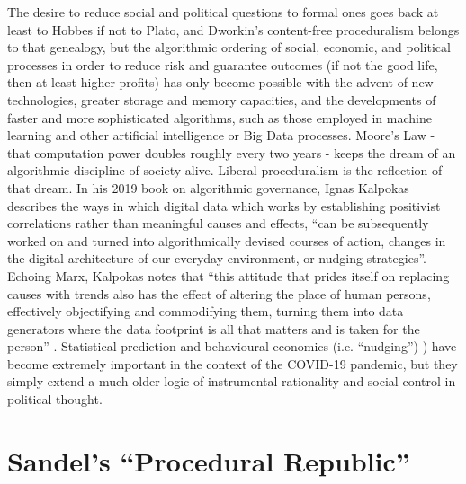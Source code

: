 \documentclass[12pt,oneside]{memoir}
\begin{document}
The desire to reduce social and political questions to formal ones goes back at least to Hobbes if not to Plato, and Dworkin's content-free proceduralism belongs to that genealogy, but the algorithmic ordering of social, economic, and political processes in order to reduce risk and guarantee outcomes (if not the good life, then at least higher profits) has only become possible with the advent of new technologies, greater storage and memory capacities, and the developments of faster and more sophisticated algorithms, such as those employed in machine learning and other artificial intelligence or Big Data processes. Moore's Law - that computation power doubles roughly every two years - keeps the dream of an algorithmic discipline of society alive. Liberal proceduralism is the reflection of that dream. In his 2019 book on algorithmic governance, Ignas Kalpokas describes the ways in which digital data which works by establishing positivist correlations rather than meaningful causes and effects, ``can be subsequently worked on and turned into algorithmically devised courses of action, changes in the digital architecture of our everyday environment, or nudging strategies''. Echoing Marx, Kalpokas notes that ``this attitude that prides itself on replacing causes with trends also has the effect of altering the place of human persons, effectively objectifying and commodifying them, turning them into data generators where the data footprint is all that matters and is taken for the person'' \citep[2]{Kalpokas2019}. Statistical prediction \citep{Joque2019} and behavioural economics (i.e. ``nudging'') \citep{Bacevic2020}) have become extremely important in the context of the COVID-19 pandemic, but they simply extend a much older logic of instrumental rationality and social control in political thought. 
	

\section*{Sandel's ``Procedural Republic''}
\end{document}
